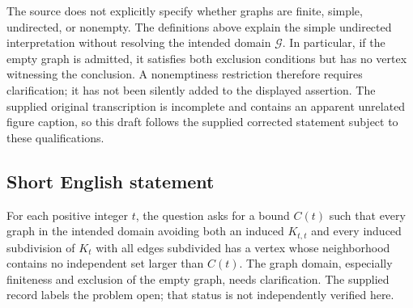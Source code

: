 \documentclass[11pt]{article}
\begin{document}
The source does not explicitly specify whether graphs are finite, simple, undirected, or nonempty. The definitions above explain the simple undirected interpretation without resolving the intended domain \(\mathcal G\). In particular, if the empty graph is admitted, it satisfies both exclusion conditions but has no vertex witnessing the conclusion. A nonemptiness restriction therefore requires clarification; it has not been silently added to the displayed assertion. The supplied original transcription is incomplete and contains an apparent unrelated figure caption, so this draft follows the supplied corrected statement subject to these qualifications.
\subsection{Short English statement}
For each positive integer \(t\), the question asks for a bound \(C(t)\) such that every graph in the intended domain avoiding both an induced \(K_{t,t}\) and every induced subdivision of \(K_t\) with all edges subdivided has a vertex whose neighborhood contains no independent set larger than \(C(t)\). The graph domain, especially finiteness and exclusion of the empty graph, needs clarification. The supplied record labels the problem open; that status is not independently verified here.
\end{document}
